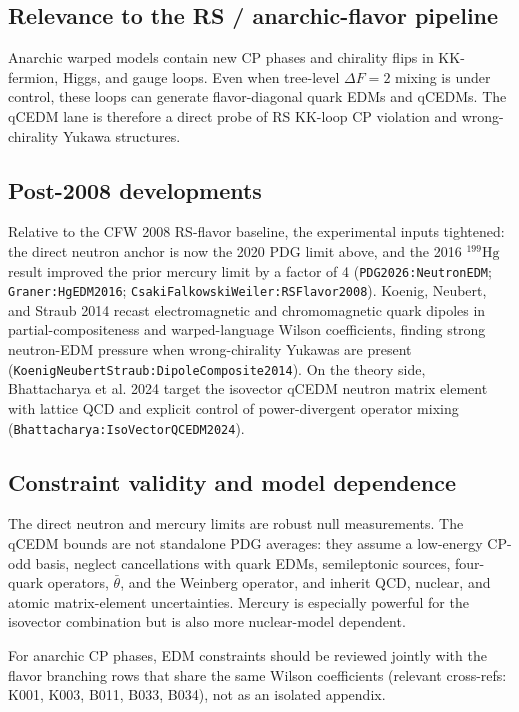 \subsection*{Relevance to the RS / anarchic-flavor pipeline}
Anarchic warped models contain new CP phases and chirality flips in KK-fermion,
Higgs, and gauge loops.  Even when tree-level \(\Delta F=2\) mixing is under
control, these loops can generate flavor-diagonal quark EDMs and qCEDMs.  The
qCEDM lane is therefore a direct probe of RS KK-loop CP violation and
wrong-chirality Yukawa structures.

\subsection*{Post-2008 developments}
Relative to the CFW 2008 RS-flavor baseline, the experimental inputs tightened:
the direct neutron anchor is now the 2020 PDG limit above, and the 2016
\(^{199}\mathrm{Hg}\) result improved the prior mercury limit by a factor of
4 (\texttt{PDG2026:NeutronEDM}; \texttt{Graner:HgEDM2016};
\texttt{CsakiFalkowskiWeiler:RSFlavor2008}).  Koenig, Neubert, and Straub
2014 recast electromagnetic and chromomagnetic quark dipoles in
partial-compositeness and warped-language Wilson coefficients, finding strong
neutron-EDM pressure when wrong-chirality Yukawas are present
(\texttt{KoenigNeubertStraub:DipoleComposite2014}).  On the theory side,
Bhattacharya et al. 2024 target the isovector qCEDM neutron matrix element with
lattice QCD and explicit control of power-divergent operator mixing
(\texttt{Bhattacharya:IsoVectorQCEDM2024}).

\subsection*{Constraint validity and model dependence}
The direct neutron and mercury limits are robust null measurements.  The qCEDM
bounds are not standalone PDG averages: they assume a low-energy CP-odd basis,
neglect cancellations with quark EDMs, semileptonic sources, four-quark
operators, \(\bar\theta\), and the Weinberg operator, and inherit QCD, nuclear,
and atomic matrix-element uncertainties.  Mercury is especially powerful for
the isovector combination but is also more nuclear-model dependent.

For anarchic CP phases, EDM constraints should be reviewed jointly with the
flavor branching rows that share the same Wilson coefficients (relevant
cross-refs: K001, K003, B011, B033, B034), not as an isolated appendix.

